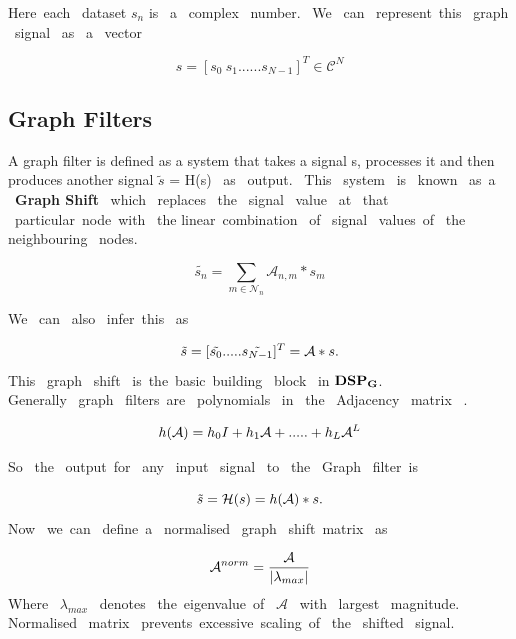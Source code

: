 \documentclass[12pt,onecolumn]{article}
\begin{document}
 Here\ each \ dataset $ s_{n} $ is \ a \ complex \ number. \ We \ can \ represent\ this \ graph \ signal \ as \ a \ vector 
 
 \begin{equation*}
     s = [s_{0} \ s_{1} ...... s_{N-1}]^T  \in \mathcal{C}^N 
 \end{equation*}


 
\subsection{{\textbf{Graph Filters}}}
A graph filter is defined as a system that takes a  signal s, processes it and then produces another signal  $\tilde{s}$ = H(s) \ as  \ output. \ This \ system \ is \ known \ as\ a \ \textbf{Graph Shift} \ which \ replaces \ the \ signal \ value \ at \ that \ particular\ node\ with \ the linear\ combination \ of \ signal \ values\ of \ the neighbouring \ nodes.

    \begin{equation*}
        \widetilde{s_{n}} = \sum_{m\in\mathcal{N}_{n}} \mathcal{A}_{n,m} *s_{m}  
    \end{equation*}

We \ can \ also \ infer\ this \ as\ 

    \begin{equation*}
        \tilde{s} = [\tilde{s_{0}} ..... \tilde{s_{N-1}}]^T = \mathcal{A}*s. \\
    \end{equation*}
 This \ graph \ shift \ is\ the\ basic\ building \ block \ in   ${{\textbf{DSP}}_{\bf{G}}}$.\\ 
Generally \ graph \ filters\ are \ polynomials \ in \ the \ Adjacency \ matrix \ .

\begin{equation*}
        h(\mathcal{A}) = h_{0}I + h_{1}\mathcal{A} + ..... + h_{L}\mathcal{A}^{L} \\ 
\end{equation*}

So \ the \ output\ for \ any \ input \ signal \ to \ the \ Graph \ filter\ is 

\begin{equation*}
    \tilde{s} = \mathcal{H}(s) = h(\mathcal{A})*s. \\
\end{equation*}
Now \ we\ can \ define\ a \ normalised \ graph \ shift\ matrix  \ as

\begin{equation*}
    \mathcal{A}^{norm} = \frac{\mathcal{A}}{|\lambda_{max}|}\\
\end{equation*}
Where \ $\lambda_{max} $ \ denotes \ the\ eigenvalue\ of  \ $\mathcal{A}$ \ with \ largest \ magnitude.\\ Normalised \ matrix \  prevents\ excessive\ scaling\ of \ the \ shifted \ signal.\\ 
\end{document}
